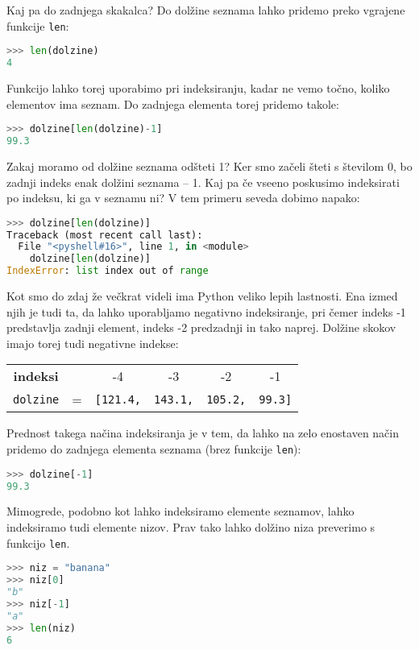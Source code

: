 Kaj pa do zadnjega skakalca? Do dolžine seznama lahko pridemo preko vgrajene funkcije \texttt{len}:
\begin{lstlisting}[language=Python, showstringspaces=false]
>>> len(dolzine)
4
\end{lstlisting}
Funkcijo lahko torej uporabimo pri indeksiranju, kadar ne vemo točno, koliko elementov ima seznam. Do zadnjega elementa torej pridemo takole:
\begin{lstlisting}[language=Python, showstringspaces=false]
>>> dolzine[len(dolzine)-1]
99.3
\end{lstlisting}
Zakaj moramo od dolžine seznama odšteti 1? Ker smo začeli šteti s številom 0, bo zadnji indeks enak dolžini seznama -- 1. Kaj pa če vseeno poskusimo indeksirati po indeksu, ki ga v seznamu ni? V tem primeru seveda dobimo napako:
\begin{lstlisting}[language=Python, showstringspaces=false]
>>> dolzine[len(dolzine)]
Traceback (most recent call last):
  File "<pyshell#16>", line 1, in <module>
    dolzine[len(dolzine)]
IndexError: list index out of range
\end{lstlisting}
Kot smo do zdaj že večkrat videli ima Python veliko lepih lastnosti. Ena izmed njih je tudi ta, da lahko uporabljamo negativno indeksiranje, pri čemer indeks -1 predstavlja zadnji element, indeks -2 predzadnji in tako naprej. Dolžine skokov imajo torej tudi negativne indekse:

\begin{tabular}{cccccc}
\textbf{indeksi} & & -4 & -3 & -2 & -1\\
\texttt{dolzine} & = & \texttt{[121.4,}& \texttt{143.1,} & \texttt{105.2,} & \texttt{99.3]}
\end{tabular}

Prednost takega načina indeksiranja je v tem, da lahko na zelo enostaven način pridemo do zadnjega elementa seznama (brez funkcije \texttt{len}):
\begin{lstlisting}[language=Python, showstringspaces=false]
>>> dolzine[-1]
99.3
\end{lstlisting}

Mimogrede, podobno kot lahko indeksiramo elemente seznamov, lahko indeksiramo tudi elemente nizov. Prav tako lahko dolžino niza preverimo s funkcijo \texttt{len}.
\begin{lstlisting}[language=Python, showstringspaces=false]
>>> niz = "banana"
>>> niz[0]
"b"
>>> niz[-1]
"a"
>>> len(niz)
6
\end{lstlisting}

